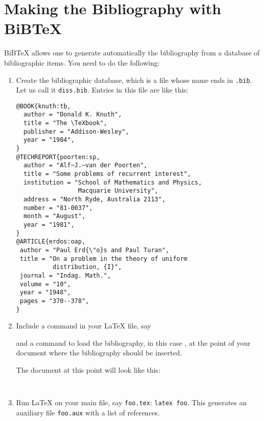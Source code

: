 \chapter{Making the Bibliography with BiB\TeX{}}\label{c:bib}
%

BiB\TeX{} 
%
allows one to generate automatically the bibliography 
from a database of bibliographic 
items. You need to do the following:

\begin{enumerate}
\item Create the bibliographic database, 
%
which is a file whose name ends in \texttt{.bib}. 
%
Let us call it \texttt{diss.bib}. Entries in this file are like this:
\begin{verbatim}
@BOOK{knuth:tb,
  author = "Donald K. Knuth",
  title = "The \TeXbook",
  publisher = "Addison-Wesley",
  year = "1984",
}
@TECHREPORT{poorten:sp,
  author = "Alf~J.~van der Poorten",
  title = "Some problems of recurrent interest",
  institution = "School of Mathematics and Physics,
                 Macquarie University",
  address = "North Ryde, Australia 2113",
  number = "81-0037",
  month = "August",
  year = "1981",
}
@ARTICLE{erdos:oap,
 author = "Paul Erd{\"o}s and Paul Turan",
 title = "On a problem in the theory of uniform 
          distribution, {I}", 
 journal = "Indag. Math.",
 volume = "10",
 year = "1948",
 pages = "370--378",
}
\end{verbatim}

\item Include a  
%
command in your \LaTeX{} file, say 

and a  
%
command to load the bibliography, 
in this case , at the point of your 
document where the bibliography should be inserted. 

The document at this point will look like this:
\begin{verbatim}


\end{verbatim}

\item Run \LaTeX{} on your main file, say \texttt{foo.tex}: 
\texttt{latex foo}. This generates an auxiliary file 
\texttt{foo.aux} with a list of  
references.


\end{enumerate}
